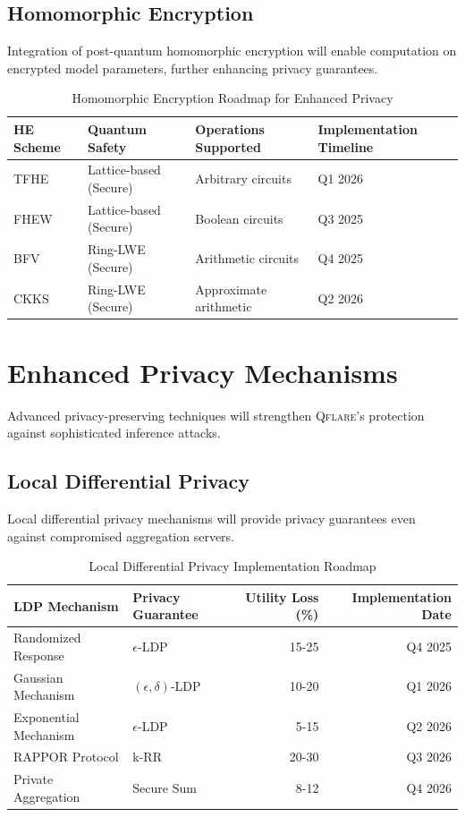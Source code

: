 \documentclass[12pt,a4paper,twoside]{book}
\newcommand{\qflare}{\textsc{Qflare}}
\begin{document}
\subsection{Homomorphic Encryption}
\label{subsec:homomorphic}

Integration of post-quantum homomorphic encryption will enable computation on encrypted model parameters, further enhancing privacy guarantees.

\begin{table}[htbp]
\centering
\caption{Homomorphic Encryption Roadmap for Enhanced Privacy}
\label{tab:homomorphic-roadmap}
\begin{tabular}{@{}llll@{}}
\toprule
\textbf{HE Scheme} & \textbf{Quantum Safety} & \textbf{Operations Supported} & \textbf{Implementation Timeline} \\
\midrule
TFHE & Lattice-based (Secure) & Arbitrary circuits & Q1 2026 \\
FHEW & Lattice-based (Secure) & Boolean circuits & Q3 2025 \\
BFV & Ring-LWE (Secure) & Arithmetic circuits & Q4 2025 \\
CKKS & Ring-LWE (Secure) & Approximate arithmetic & Q2 2026 \\
\bottomrule
\end{tabular}
\end{table}

\section{Enhanced Privacy Mechanisms}
\label{sec:enhanced-privacy}

Advanced privacy-preserving techniques will strengthen \qflare{}'s protection against sophisticated inference attacks.

\subsection{Local Differential Privacy}
\label{subsec:local-dp}

Local differential privacy mechanisms will provide privacy guarantees even against compromised aggregation servers.

\begin{table}[htbp]
\centering
\caption{Local Differential Privacy Implementation Roadmap}
\label{tab:ldp-roadmap}
\begin{tabular}{@{}llrr@{}}
\toprule
\textbf{LDP Mechanism} & \textbf{Privacy Guarantee} & \textbf{Utility Loss (\%)} & \textbf{Implementation Date} \\
\midrule
Randomized Response & $\epsilon$-LDP & 15-25 & Q4 2025 \\
Gaussian Mechanism & $(\epsilon,\delta)$-LDP & 10-20 & Q1 2026 \\
Exponential Mechanism & $\epsilon$-LDP & 5-15 & Q2 2026 \\
RAPPOR Protocol & k-RR & 20-30 & Q3 2026 \\
Private Aggregation & Secure Sum & 8-12 & Q4 2026 \\
\bottomrule
\end{tabular}
\end{table}
\end{document}
